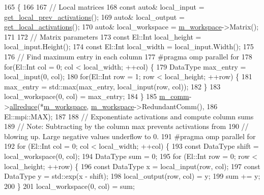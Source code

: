 \begin{DoxyCode}
165                                 \{
166 
167     \textcolor{comment}{// Local matrices}
168     \textcolor{keyword}{const} \textcolor{keyword}{auto}& local\_input = \hyperlink{classlbann_1_1Layer_a35397843bb0c84030000c7d872229acb}{get\_local\_prev\_activations}();
169     \textcolor{keyword}{auto}& local\_output = \hyperlink{classlbann_1_1Layer_a4248f27acebf72b7b7b3ee39c8bcb62a}{get\_local\_activations}();
170     \textcolor{keyword}{auto}& local\_workspace = \hyperlink{classlbann_1_1softmax__layer_a604e614de25758f0072308c7efdd5bdb}{m\_workspace}->Matrix();
171     
172     \textcolor{comment}{// Matrix parameters}
173     \textcolor{keyword}{const} El::Int local\_height = local\_input.Height();
174     \textcolor{keyword}{const} El::Int local\_width = local\_input.Width();
175 
176     \textcolor{comment}{// Find maximum entry in each column}
177 \textcolor{preprocessor}{    #pragma omp parallel for}
178     \textcolor{keywordflow}{for}(El::Int col = 0; col < local\_width; ++col) \{
179       DataType max\_entry = local\_input(0, col);
180       \textcolor{keywordflow}{for}(El::Int row = 1; row < local\_height; ++row) \{
181         max\_entry = std::max(max\_entry, local\_input(row, col));
182       \}
183       local\_workspace(0, col) = max\_entry;
184     \}
185     \hyperlink{classlbann_1_1Layer_a5de05c52f22e0bbd7c703bec3ad4dbf2}{m\_comm}->\hyperlink{classlbann_1_1lbann__comm_af5631e5f0f54e4df4958eba9df2599ef}{allreduce}(*\hyperlink{classlbann_1_1softmax__layer_a604e614de25758f0072308c7efdd5bdb}{m\_workspace}, \hyperlink{classlbann_1_1softmax__layer_a604e614de25758f0072308c7efdd5bdb}{m\_workspace}->RedundantComm(),
186                       El::mpi::MAX);
187 
188     \textcolor{comment}{// Exponentiate activations and compute column sums}
189     \textcolor{comment}{// Note: Subtracting by the column max prevents activations from}
190     \textcolor{comment}{// blowing up. Large negative values underflow to 0.}
191 \textcolor{preprocessor}{    #pragma omp parallel for}
192     \textcolor{keywordflow}{for} (El::Int col = 0; col < local\_width; ++col) \{
193       \textcolor{keyword}{const} DataType shift = local\_workspace(0, col);
194       DataType sum = 0;
195       \textcolor{keywordflow}{for} (El::Int row = 0; row < local\_height; ++row) \{
196         \textcolor{keyword}{const} DataType x = local\_input(row, col);
197         \textcolor{keyword}{const} DataType y = std::exp(x - shift);
198         local\_output(row, col) = y;
199         sum += y;
200       \}
201       local\_workspace(0, col) = sum;

\end{DoxyCode}
